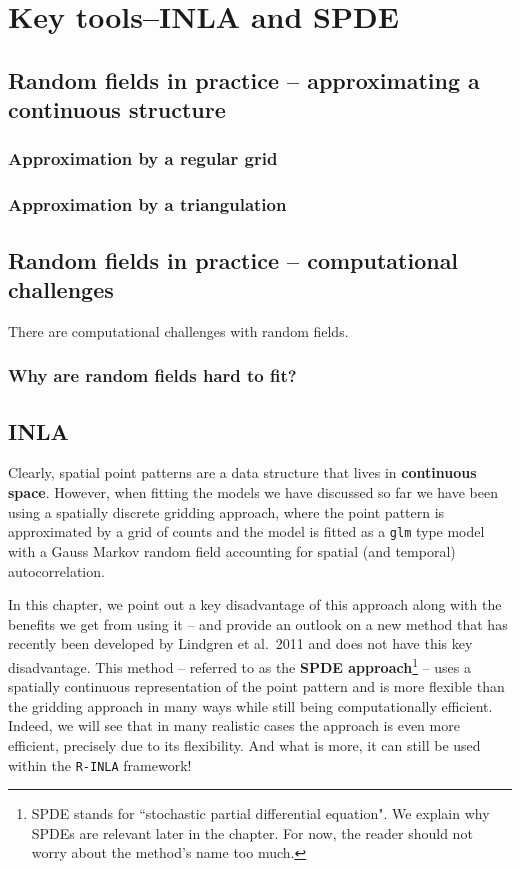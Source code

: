 \chapter{Key tools--INLA and SPDE}

\section{Random fields in practice -- approximating a continuous structure}

\subsection{Approximation by a regular grid}
\subsection{Approximation by a triangulation}

\section{Random fields in practice -- computational challenges}
There are computational challenges with random fields.

\subsection{Why are random fields hard to fit?}

\section{INLA}


Clearly, spatial point patterns are a data structure that lives in \textbf{continuous space}. However, when fitting the models we have discussed so far we have been using a spatially discrete gridding approach, where the point pattern is approximated by a grid of counts and the model is fitted as a \texttt{glm} type model with a Gauss Markov random field accounting for spatial (and temporal) autocorrelation. 

In this chapter, we point out a key disadvantage of this approach along with the benefits we get from using it -- and provide an outlook on a new method that has recently been developed by Lindgren et al.\ 2011 and does not have this key disadvantage. This method -- referred to as the \textbf{SPDE approach}\footnote{SPDE stands for ``stochastic partial differential equation". We explain why SPDEs are relevant later in the chapter. For now, the reader should not worry about the method's name too much.} --  uses a spatially continuous representation of the point pattern and is more flexible than the gridding approach in many ways while still being computationally efficient. Indeed, we will see that in many realistic cases the approach is even more  efficient, precisely due to its flexibility. And what is more, it can still be used within the \texttt{R-INLA} framework! 

